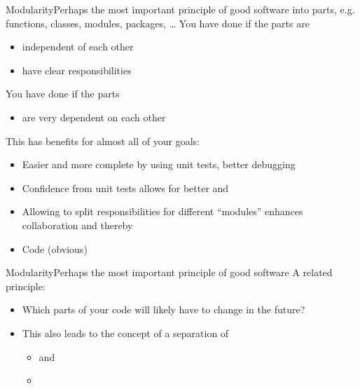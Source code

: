 \begin{frame}{Modularity}{Perhaps the most important principle of good software}
	 into parts, e.g. functions, classes, modules, packages, \dots
	\bigskip
	You have done  if the parts are 
	\begin{itemize}
		\item independent of each other
		\item have clear responsibilities
	\end{itemize}

	You have done  if the parts
	\begin{itemize}
		\item are very dependent on each other 
	\end{itemize}

	\bigskip
	This has benefits for almost all of your goals:
	\begin{itemize}
		\item Easier and more complete  by using unit tests, better debugging
		\item Confidence from unit tests allows for better  and 
		\item Allowing to split responsibilities for different \enquote{modules} enhances collaboration and thereby 
		\item Code  (obvious)
	\end{itemize}
	
	
\end{frame}

\begin{frame}{Modularity}{Perhaps the most important principle of good software}
	A related principle: 
	
	\begin{itemize}
		\item Which parts of your code will likely have to change in the future?\\
		 \item This also leads to the concept of a separation of 
		 \begin{itemize}
		 	\item {}  and
		 	\item {} 
		 \end{itemize}
	\end{itemize}
\end{frame}

